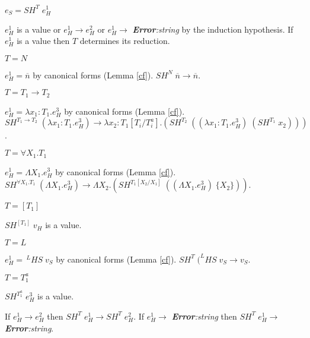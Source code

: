 \begin{case}
$e_{S}=SH^{T}\;e_{H}^{1}$

$e_{H}^{1}$ is a value or $e_{H}^{1}\rightarrow e_{H}^{2}$ or $e_{H}^{1}\rightarrow$ \emph{\textbf{Error}:\;string} by the induction hypothesis.  If $e_{H}^{1}$ is a value then $T$ determines its reduction.
\begin{subcase}
$T=N$

$e_{H}^{1}=\overline{n}$ by canonical forms (Lemma \ref{cf}).  $SH^{N}\;\overline{n}\rightarrow\overline{n}$.
\end{subcase}
\begin{subcase}
$T=T_{1}\rightarrow T_{2}$

$e_{H}^{1}=\lambda x_{1}:T_{1}.e_{H}^{3}$ by canonical forms (Lemma \ref{cf}).  $SH^{T_{1}\rightarrow T_{2}}\;(\lambda x_{1}:T_{1}.e_{H}^{3})\rightarrow\lambda x_{2}:T_{1}[T_{i}/T^{a}_{i}].(SH^{T_{2}}\;((\lambda x_{1}:T_{1}.e_{H}^{3})\;(SH^{T_{1}}\;x_{2})))$.
\end{subcase}
\begin{subcase}
$T=\forall X_{1}.T_{1}$

$e_{H}^{1}=\Lambda X_{1}.e_{H}^{3}$ by canonical forms (Lemma \ref{cf}).  $SH^{\forall X_{1}.T_{1}}\;(\Lambda X_{1}.e_{H}^{3})\rightarrow\Lambda X_{2}.(SH^{T_{1}[X_{2}/X_{1}]}\;((\Lambda X_{1}.e_{H}^{3})\;\lbrace X_{2}\rbrace))$.
\end{subcase}
\begin{subcase}
$T=[T_{1}]$

$SH^{[T_{1}]}\;v_{H}$ is a value.
\end{subcase}
\begin{subcase}
$T=L$

$e_{H}^{1}=\,^{L}HS\;v_{S}$ by canonical forms (Lemma \ref{cf}).  $SH^{T}\;(^{L}HS\;v_{S}\rightarrow v_{S}$.
\end{subcase}
\begin{subcase}
$T=T_{1}^{a}$

$SH^{T_{1}^{a}}\;e_{H}^{3}$ is a value.
\end{subcase}
If $e_{H}^{1}\rightarrow e_{H}^{2}$ then $SH^{T}\;e_{H}^{1}\rightarrow SH^{T}\;e_{H}^{2}$.  If $e_{H}^{1}\rightarrow$ \emph{\textbf{Error}:\;string} then $SH^{T}\;e_{H}^{1}\rightarrow$ \emph{\textbf{Error}:\;string}.
\end{case}
